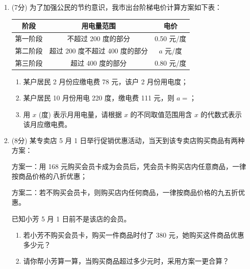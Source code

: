 \documentclass[11pt,a4paper]{ctexart}
\begin{document}
\begin{enumerate}
    \item[12.] (7分) 为了加强公民的节约意识，我市出台阶梯电价计算方案如下表：
    \begin{table}[htbp]
        \centering
        \begin{tabular}{|c|c|c|}
            \hline
            阶段 & 用电量范围 & 电价 \\
            \hline
            第一阶段 & 不超过 200 度的部分 & 0.50 元/度 \\
            \hline
            第二阶段 & 超过 200 度不超过 400 度的部分 & $a$ 元/度 \\
            \hline
            第三阶段 & 超过 400 度的部分 & 0.80 元/度 \\
            \hline
        \end{tabular}
    \end{table}
    \begin{enumerate}
        \item[(1)] 某户居民 2 月份应缴电费 78 元，该户 2 月份用电\underline{\hspace{2cm}}度；
        \vspace{1.5cm}
        \item[(2)] 某户居民 10 月份用电 220 度，缴电费 111 元，则 $a=$\underline{\hspace{2cm}}；
        \vspace{1.5cm}
        \item[(3)] 用 $x$ (度) 表示月用电量，请根据 $x$ 的不同取值范围用含 $x$ 的代数式表示该月应缴电费。
        \vspace{3.5cm}
    \end{enumerate}

    \item[13.] (8分) 某专卖店 5 月 1 日举行促销优惠活动，当天到该专卖店购买商品有两种方案：
    
    方案一：用 168 元购买会员卡成为会员后，凭会员卡购买店内任意商品，一律按商品价格的八折优惠；
    
    方案二：若不购买会员卡，则购买店内任何商品，一律按商品价格的九五折优惠。
    
    已知小芳 5 月 1 日前不是该店的会员。
    \begin{enumerate}
        \item[(1)] 若小芳不购买会员卡，购买一件商品时付了 380 元，她购买这件商品优惠多少元？
        \vspace{3.0cm}
        \item[(2)] 请你帮小芳算一算，当购买商品超过多少元时，采用方案一更合算？
        \vspace{3.5cm}
    \end{enumerate}


\end{enumerate}
\end{document}
